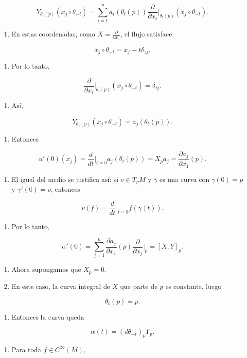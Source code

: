 \begin{bookproof}{}
\[
Y_{\theta_t(p)}(x_j\circ\theta_{-t})=\sum_{i=1}^n a_i(\theta_t(p))\frac{\partial}{\partial x_i}\bigg|_{\theta_t(p)}(x_j\circ\theta_{-t}).
\]
\begin{enumerate}[start=19]
\item En estas coordenadas, como $X=\frac{\partial}{\partial x_1}$, el flujo satisface
\end{enumerate}
\[
x_j\circ\theta_{-t}=x_j-t\delta_{1j}.
\]
\begin{enumerate}[start=20]
\item Por lo tanto,
\end{enumerate}
\[
\frac{\partial}{\partial x_i}\bigg|_{\theta_t(p)}(x_j\circ\theta_{-t})=\delta_{ij}.
\]
\begin{enumerate}[start=21]
\item Así,
\end{enumerate}
\[
Y_{\theta_t(p)}(x_j\circ\theta_{-t})=a_j(\theta_t(p)).
\]
\begin{enumerate}[start=22]
\item Entonces
\end{enumerate}
\[
\alpha'(0)(x_j)=\frac{d}{dt}\bigg|_{t=0}a_j(\theta_t(p))=X_pa_j=\frac{\partial a_j}{\partial x_1}(p).
\]
\begin{enumerate}[start=23]
\item El igual del medio se justifica así: si $v\in T_pM$ y $\gamma$ es una curva con $\gamma(0)=p$ y $\gamma'(0)=v$, entonces
\end{enumerate}
\[
v(f)=\frac{d}{dt}\bigg|_{t=0}f(\gamma(t)).
\]
\begin{enumerate}[start=24]
\item Por lo tanto,
\end{enumerate}
\[
\alpha'(0)=\sum_{j=1}^n \frac{\partial a_j}{\partial x_1}(p)\frac{\partial}{\partial x_j}\bigg|_p=[X,Y]_p.
\]
\begin{enumerate}[start=25]
\item Ahora supongamos que $X_p=0$.
\item En este caso, la curva integral de $X$ que parte de $p$ es constante, luego
\end{enumerate}
\[
\theta_t(p)=p.
\]
\begin{enumerate}[start=27]
\item Entonces la curva queda
\end{enumerate}
\[
\alpha(t)=(d\theta_{-t})_pY_p.
\]
\begin{enumerate}[start=28]
\item Para toda $f\in C^\infty(M)$,
\end{enumerate}

\end{bookproof}
